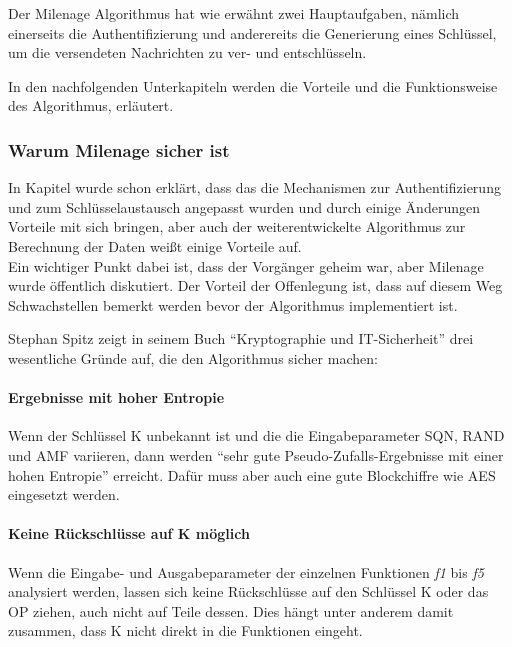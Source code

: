 Der Milenage Algorithmus hat wie erwähnt zwei Hauptaufgaben, nämlich einerseits die
Authentifizierung und anderereits die Generierung eines Schlüssel, um die versendeten Nachrichten zu
ver- und entschlüsseln.

In den nachfolgenden Unterkapiteln werden die Vorteile und die Funktionsweise des
Algorithmus, erläutert.

 \subsubsection{Warum Milenage sicher ist}
 In Kapitel  wurde schon erklärt, dass das die Mechanismen
 zur Authentifizierung und zum Schlüsselaustausch angepasst wurden und durch einige
 Änderungen Vorteile mit sich bringen, aber auch der weiterentwickelte Algorithmus zur
 Berechnung der Daten weißt einige Vorteile auf. \\
 Ein wichtiger Punkt dabei ist, dass der Vorgänger geheim war, aber Milenage wurde öffentlich
 diskutiert. Der Vorteil der Offenlegung ist, dass auf diesem Weg Schwachstellen bemerkt werden
 bevor der Algorithmus implementiert ist. 
 
 Stephan Spitz zeigt in seinem Buch ``Kryptographie und IT-Sicherheit'' \cite{spitz11} drei
 wesentliche Gründe auf, die den Algorithmus sicher machen:
 
 \paragraph{Ergebnisse mit hoher Entropie}
 Wenn der Schlüssel \ac{K} unbekannt ist und die die Eingabeparameter \ac{SQN}, \ac{RAND}
 und \ac{AMF} variieren, dann werden ``sehr gute Pseudo-Zufalls-Ergebnisse mit einer hohen
 Entropie'' \cite{spitz11} erreicht. Dafür muss aber auch eine gute Blockchiffre wie AES
 eingesetzt werden.
 
 \paragraph{Keine Rückschlüsse auf K möglich}
 Wenn die Eingabe- und Ausgabeparameter der einzelnen Funktionen \emph{f1} bis \emph{f5}
 analysiert werden, lassen sich keine Rückschlüsse auf den Schlüssel K oder das \acf{OP}
 ziehen, auch nicht auf Teile dessen. Dies hängt unter anderem damit zusammen, dass K nicht
 direkt in die Funktionen eingeht.
 
